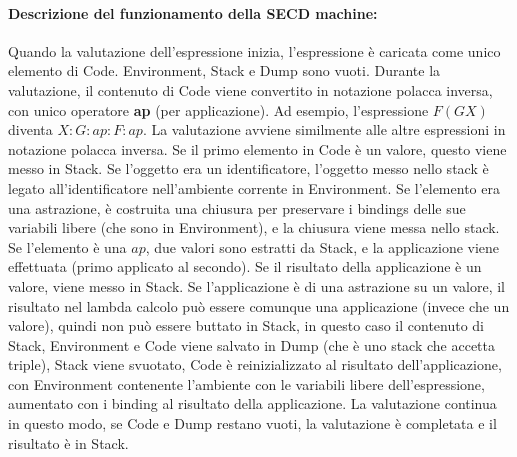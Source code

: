 \documentclass{article}
\begin{document}
\paragraph{Descrizione del funzionamento della SECD machine:}
Quando la valutazione dell'espressione inizia, l'espressione è caricata come unico elemento di Code. Environment, Stack e Dump sono vuoti.
Durante la valutazione, il contenuto di Code viene convertito in notazione polacca inversa, con unico operatore \textbf{ap} (per applicazione).
Ad esempio, l'espressione $F ( G X )$ diventa $X:G:ap:F:ap$.
La valutazione avviene similmente alle altre espressioni in notazione polacca inversa.
Se il primo elemento in Code è un valore, questo viene messo in Stack. Se l'oggetto era un identificatore, l'oggetto messo nello stack è legato all'identificatore nell'ambiente corrente in Environment. Se l'elemento era una astrazione, è costruita una chiusura per preservare i bindings delle sue variabili libere (che sono in Environment), e la chiusura viene messa nello stack.
Se l'elemento è una $ap$, due valori sono estratti da Stack, e la applicazione viene effettuata (primo applicato al secondo). Se il risultato della applicazione è un valore, viene messo in Stack.
Se l'applicazione è di una astrazione su un valore, il risultato nel lambda calcolo può essere comunque una applicazione (invece che un valore), quindi non può essere buttato in Stack, in questo caso il contenuto di Stack, Environment e Code viene salvato in Dump (che è uno stack che accetta triple), Stack viene svuotato, Code è reinizializzato al risultato dell'applicazione, con Environment contenente l'ambiente con le variabili libere dell'espressione, aumentato con i binding al risultato della applicazione.
La valutazione continua in questo modo, se Code e Dump restano vuoti, la valutazione è completata e il risultato è in Stack.


%

%

%

%


\printbibliography
\end{document}
